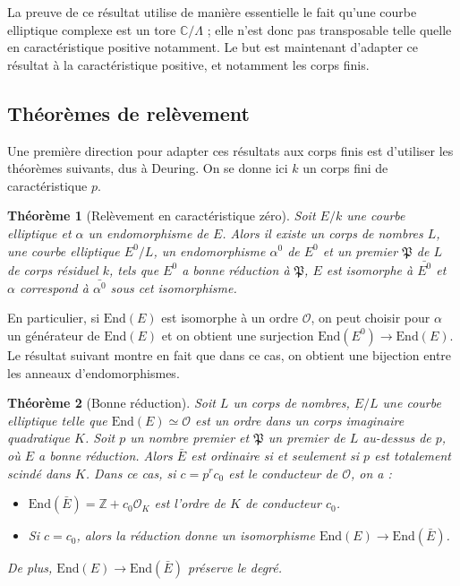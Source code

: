 \documentclass[11pt,a4paper]{article}
\newcommand{\Z}{\mathbb{Z}}
\newcommand{\C}{\mathbb{C}}
\renewcommand{\O}{\mathcal{O}}
\newcommand{\vers}{\longrightarrow}
\newcommand{\End}{\mathrm{End}}
\renewcommand{\frak}{\mathfrak}
\newtheorem*{thm}{Théorème}
\theoremstyle{definition}
\begin{document}
La preuve de ce résultat utilise de manière essentielle le fait qu'une courbe elliptique complexe est un tore $\C/\Lambda$ ; elle n'est donc pas transposable telle quelle en caractéristique positive notamment. Le but est maintenant d'adapter ce résultat à la caractéristique positive, et notamment les corps finis.




\subsection{Théorèmes de relèvement}


Une première direction pour adapter ces résultats aux corps finis est d'utiliser les théorèmes suivants, dus à Deuring. On se donne ici $k$ un corps fini de caractéristique $p$.


\begin{thm}[Relèvement en caractéristique zéro]

Soit $E/k$ une courbe elliptique et $\alpha$ un endomorphisme de $E$. Alors il existe un corps de nombres $L$, une courbe elliptique $E^0/L$, un endomorphisme $\alpha^0$ de $E^0$ et un premier $\frak P$ de $L$ de corps résiduel $k$, tels que $E^0$ a bonne réduction à $\frak P$, $E$ est isomorphe à $\bar{E^0}$ et $\alpha$ correspond à $\bar{\alpha^0}$ sous cet isomorphisme.

\end{thm}

En particulier, si $\End(E)$ est isomorphe à un ordre $\O$, on peut choisir pour $\alpha$ un générateur de $\End(E)$ et on obtient une surjection $\End(E^0)\vers \End(E).$ Le résultat suivant montre en fait que dans ce cas, on obtient une bijection entre les anneaux d'endomorphismes.

\begin{thm}[Bonne réduction]

Soit $L$ un corps de nombres, $E/L$ une courbe elliptique telle que $\End(E)\simeq \O$ est un ordre dans un corps imaginaire quadratique $K$. Soit $p$ un nombre premier et $\frak P$ un premier de $L$ au-dessus de $p$, où $E$ a bonne réduction. Alors $\bar{E}$ est ordinaire si et seulement si $p$ est totalement scindé dans $K$. Dans ce cas, si $c=p^r c_0$ est le conducteur de $\O$, on a :

\begin{itemize}
\item[(i)] $\End(\bar{E})=\Z+c_0 \O_K$ est l'ordre de $K$ de conducteur $c_0$.
\item[(ii)] Si $c=c_0$, alors la réduction donne un isomorphisme $\End(E)\vers\End(\bar{E})$.
\end{itemize}

De plus, $\End(E)\vers\End(\bar{E})$ préserve le degré.

\end{thm}
\end{document}
